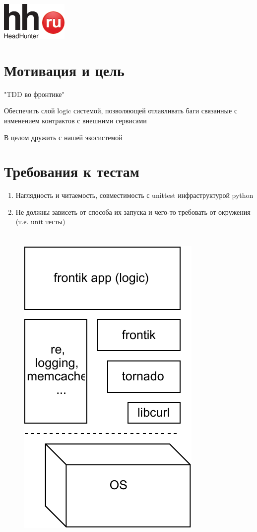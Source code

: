 \documentclass[12pt]{article}
\begin{document}
\includegraphics{logo.png}
\TitleSlide

\section{Мотивация и цель}
"TDD во фронтике"

Обеспечить слой logic системой, позволяющей отлавливать баги связанные с изменением контрактов с внешними сервисами

В целом дружить с нашей экосистемой

\section{Требования к тестам}

\begin{enumerate}
\item Наглядность и читаемость, совместимость с unittest инфраструктурой python
\item Не должны зависеть от способа их запуска и чего-то требовать от окружения (т.е. unit тесты)
\end{enumerate}

\section{}
\begin{figure}[ht!]
\includegraphics[page=1, scale=1.6]{frontikarchitecture.pdf}
%
\end{figure}
\end{document}
